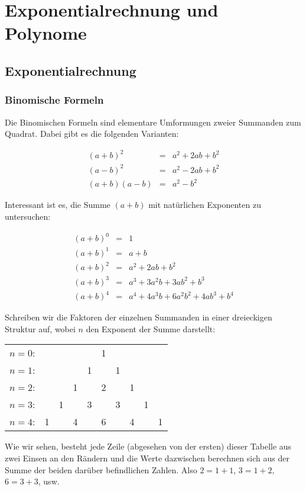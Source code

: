 

\chapter{Exponentialrechnung und Polynome}


\section{Exponentialrechnung}

\subsection{Binomische Formeln}

Die Binomischen Formeln sind elementare Umformungen zweier Summanden zum Quadrat. Dabei gibt es die folgenden Varianten:

\begin{eqnarray}
(a+b)^2 &=& a^2 +2ab +b^2 \label{eq:binom1} \\
(a-b)^2 &=& a^2 -2ab +b^2 \label{eq:binom2} \\
(a+b)(a-b) &=& a^2 -b^2 \label{eq:binom3}
\end{eqnarray}

Interessant ist es, die Summe $(a+b)$ mit natürlichen Exponenten zu untersuchen:

\begin{eqnarray*}
(a+b)^0 &=& 1 \\
(a+b)^1 &=& a+b \\
(a+b)^2 &=& a^2 +2ab +b^2 \\
(a+b)^3 &=& a^3 + 3a^2b + 3ab^2 +b^3 \\
(a+b)^4 &=& a^4 + 4a^3b + 6a^2b^2 +4ab^3 + b^4
\end{eqnarray*}


\begin{definition}
Schreiben wir die Faktoren der einzelnen Summanden in einer dreieckigen Struktur auf, wobei $n$ den Exponent der Summe darstellt:

\begin{center}
\begin{tabular}{rccccccccc} 
$n=0$:& & & & & 1\\
\noalign{\smallskip} $n=1$:& & & & 1 & & 1\\
\noalign{\smallskip} $n=2$:& & & 1 & & 2 & & 1\\
\noalign{\smallskip} $n=3$:& & 1 & & 3 & & 3 & & 1\\
\noalign{\smallskip} $n=4$:& 1 & & 4 & & 6 & & 4 & & 1
\end{tabular}
\end{center}
Wie wir sehen, besteht jede Zeile (abgesehen von der ersten) dieser Tabelle aus zwei Einsen an den Rändern und die Werte dazwischen berechnen sich aus der Summe der beiden darüber befindlichen Zahlen. Also $2=1+1$, $3=1+2$, $6=3+3$, usw.
\end{definition}

